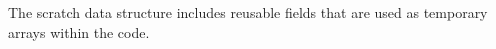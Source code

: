The scratch data structure includes reusable fields that are used as temporary arrays within the code.
